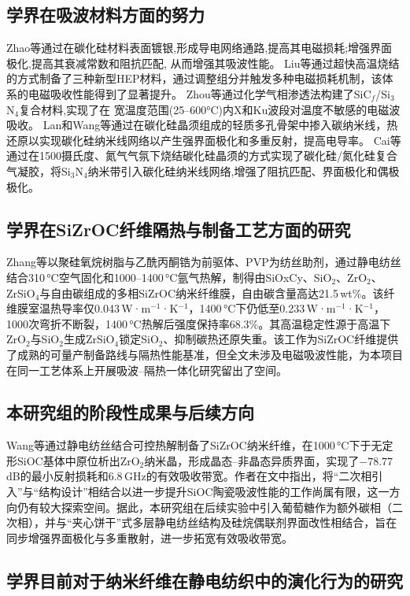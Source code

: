 \subsection{学界在吸波材料方面的努力}
Zhao等\cite{zhao2022a}通过在碳化硅材料表面镀银,形成导电网络通路,提高其电磁损耗;增强界面极化,提高其衰减常数和阻抗匹配, 从而增强其吸波性能。
Liu等\cite{liu2025}通过超快高温烧结的方式制备了三种新型HEP材料，通过调整组分并触发多种电磁损耗机制，该体系的电磁吸收性能得到了显著提升。
Zhou等\cite{zhou2019}通过化学气相渗透法构建了SiC$_f$/Si$_3$N$_4$复合材料,实现了在 宽温度范围(25–600°C)内X和Ku波段对温度不敏感的电磁波吸收。
Lan和Wang等\cite{lan2020}通过在碳化硅晶须组成的轻质多孔骨架中掺入碳纳米线，热还原以实现碳化硅纳米线网络以产生强界面极化和多重反射，提高电导率。
Cai等\cite{cai2024}通过在1500摄氏度、氮气气氛下烧结碳化硅晶须的方式实现了碳化硅/氮化硅复合气凝胶，将Si$_3$N$_4$纳米带引入碳化硅纳米线网络,增强了阻抗匹配、界面极化和偶极极化。
\subsection{学界在SiZrOC纤维隔热与制备工艺方面的研究}
Zhang等\cite{zhang2021a}以聚硅氧烷树脂与乙酰丙酮锆为前驱体、PVP为纺丝助剂，通过静电纺丝结合310\,°C空气固化和1000–1400\,°C氩气热解，制得由SiOxCy、SiO$_2$、ZrO$_2$、ZrSiO$_4$与自由碳组成的多相SiZrOC纳米纤维膜，自由碳含量高达21.5\,wt\%。该纤维膜室温热导率仅0.043\,W·m$^{-1}$·K$^{-1}$，1400\,°C下仍低至0.233\,W·m$^{-1}$·K$^{-1}$，1000次弯折不断裂，1400\,°C热解后强度保持率68.3\%。其高温稳定性源于高温下ZrO$_2$与SiO$_2$生成ZrSiO$_4$锁定SiO$_2$、抑制碳热还原失重。该工作为SiZrOC纤维提供了成熟的可量产制备路线与隔热性能基准，但全文未涉及电磁吸波性能，为本项目在同一工艺体系上开展吸波–隔热一体化研究留出了空间。
\subsection{本研究组的阶段性成果与后续方向}
Wang等\cite{wang2025}通过静电纺丝结合可控热解制备了SiZrOC纳米纤维，在1000\,°C下于无定形SiOC基体中原位析出ZrO$_2$纳米晶，形成晶态–非晶态异质界面，实现了$-78.77$\,dB的最小反射损耗和6.8\,GHz的有效吸收带宽。作者在文中指出，将“二次相引入”与“结构设计”相结合以进一步提升SiOC陶瓷吸波性能的工作尚属有限，这一方向仍有较大探索空间。据此，本研究组在后续实验中引入葡萄糖作为额外碳相（二次相），并与“夹心饼干”式多层静电纺丝结构及硅烷偶联剂界面改性相结合，旨在同步增强界面极化与多重散射，进一步拓宽有效吸收带宽。

\subsection{学界目前对于纳米纤维在静电纺织中的演化行为的研究}
